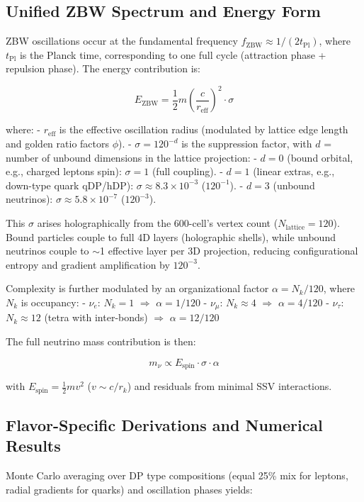 \documentclass{article}
\begin{document}
\subsection{Unified ZBW Spectrum and Energy Form}

ZBW oscillations occur at the fundamental frequency $f_{\text{ZBW}} \approx 1/(2 t_{\text{Pl}})$, where $t_{\text{Pl}}$ is the Planck time, corresponding to one full cycle (attraction phase + repulsion phase). The energy contribution is:

\[
E_{\text{ZBW}} = \frac{1}{2} m \left( \frac{c}{r_{\text{eff}}} \right)^2 \cdot \sigma
\]

where:
- $r_{\text{eff}}$ is the effective oscillation radius (modulated by lattice edge length and golden ratio factors $\phi$).
- $\sigma = 120^{-d}$ is the suppression factor, with $d$ = number of unbound dimensions in the lattice projection:
  - $d=0$ (bound orbital, e.g., charged leptons spin): $\sigma = 1$ (full coupling).
  - $d=1$ (linear extras, e.g., down-type quark qDP/hDP): $\sigma \approx 8.3 \times 10^{-3}$ ($120^{-1}$).
  - $d=3$ (unbound neutrinos): $\sigma \approx 5.8 \times 10^{-7}$ ($120^{-3}$).

This $\sigma$ arises holographically from the 600-cell's vertex count ($N_{\text{lattice}} = 120$). Bound particles couple to full 4D layers (holographic shells), while unbound neutrinos couple to $\sim$1 effective layer per 3D projection, reducing configurational entropy and gradient amplification by $120^{-3}$.

Complexity is further modulated by an organizational factor $\alpha = N_k / 120$, where $N_k$ is occupancy:
- $\nu_e$: $N_k = 1$ $\Rightarrow$ $\alpha = 1/120$
- $\nu_\mu$: $N_k \approx 4$ $\Rightarrow$ $\alpha = 4/120$
- $\nu_\tau$: $N_k \approx 12$ (tetra with inter-bonds) $\Rightarrow$ $\alpha = 12/120$

The full neutrino mass contribution is then:

\[
m_{\nu} \propto E_{\text{spin}} \cdot \sigma \cdot \alpha
\]

with $E_{\text{spin}} = \frac{1}{2} m v^2$ ($v \sim c / r_k$) and residuals from minimal SSV interactions.

\subsection{Flavor-Specific Derivations and Numerical Results}

Monte Carlo averaging over DP type compositions (equal 25\% mix for leptons, radial gradients for quarks) and oscillation phases yields:
\end{document}
